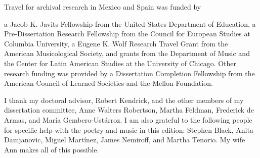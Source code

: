 Travel for archival research in Mexico and Spain was funded by 
\begin{anonymize}
a Jacob K. Javits Fellowship from the United States Department of Education, 
a Pre-Dissertation Research Fellowship from the Council for European Studies at Columbia University, 
a Eugene K. Wolf Research Travel Grant from the American Musicological Society, 
and grants from the Department of Music and the Center for Latin American Studies at the University of Chicago.
Other research funding was provided by a Dissertation Completion Fellowship from the American Council of Learned Societies and the Mellon Foundation.

I thank my doctoral advisor, Robert Kendrick, and the other members of my dissertation committee, Anne Walters Robertson, Martha Feldman, Frederick de Armas, and María Gembero-Ustárroz.
I am also grateful to the following people for specific help with the poetry and music in this edition:
Stephen Black,
Anita Damjanovic, 
Miguel Martínez, 
James Nemiroff, and
Martha Tenorio.
My wife Ann makes all of this possible.
\end{anonymize}
